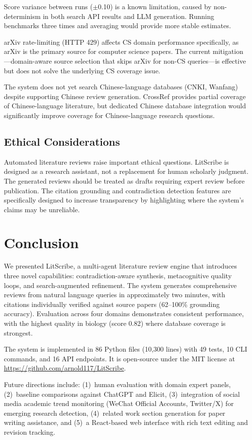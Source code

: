 \documentclass[11pt]{article}
\begin{document}
Score variance between runs ($\pm$0.10) is a known limitation, caused by non-determinism in both search API results and LLM generation. Running benchmarks three times and averaging would provide more stable estimates.

arXiv rate-limiting (HTTP 429) affects CS domain performance specifically, as arXiv is the primary source for computer science papers. The current mitigation---domain-aware source selection that skips arXiv for non-CS queries---is effective but does not solve the underlying CS coverage issue.

The system does not yet search Chinese-language databases (CNKI, Wanfang) despite supporting Chinese review generation. CrossRef provides partial coverage of Chinese-language literature, but dedicated Chinese database integration would significantly improve coverage for Chinese-language research questions.

\subsection{Ethical Considerations}

Automated literature reviews raise important ethical questions. LitScribe is designed as a research assistant, not a replacement for human scholarly judgment. The generated reviews should be treated as drafts requiring expert review before publication. The citation grounding and contradiction detection features are specifically designed to increase transparency by highlighting where the system's claims may be unreliable.

\section{Conclusion}

We presented LitScribe, a multi-agent literature review engine that introduces three novel capabilities: contradiction-aware synthesis, metacognitive quality loops, and search-augmented refinement. The system generates comprehensive reviews from natural language queries in approximately two minutes, with citations individually verified against source papers (62--100\% grounding accuracy). Evaluation across four domains demonstrates consistent performance, with the highest quality in biology (score 0.82) where database coverage is strongest.

The system is implemented in 86 Python files (10,300 lines) with 49 tests, 10 CLI commands, and 16 API endpoints. It is open-source under the MIT license at \url{https://github.com/arnold117/LitScribe}.

Future directions include: (1)~human evaluation with domain expert panels, (2)~baseline comparisons against ChatGPT and Elicit, (3)~integration of social media academic trend monitoring (WeChat Official Accounts, Twitter/X) for emerging research detection, (4)~related work section generation for paper writing assistance, and (5)~a React-based web interface with rich text editing and revision tracking.



\end{document}
